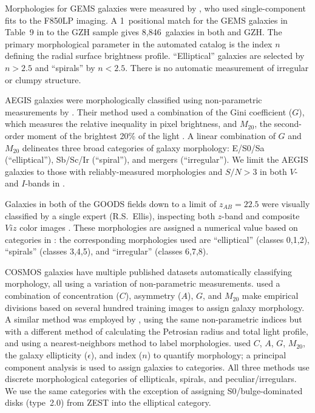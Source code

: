 \documentclass[twocolumn]{aastex6}
\begin{document}
Morphologies for GEMS galaxies were measured by \citet{hau07}, who used
single-component \sersic{} fits to the F850LP imaging. A 1\arcsec~positional
match for the GEMS galaxies in Table~9 in \citet{hau07} to the GZH sample gives
8,846~galaxies in both \citet{hau07} and GZH. The primary morphological
parameter in the automated catalog is the \sersic{} index $n$ defining the
radial surface brightness profile.  ``Elliptical'' galaxies are selected by
$n>2.5$ and ``spirals''  by $n<2.5$.  There is no automatic measurement of
irregular or clumpy structure. 

AEGIS galaxies were morphologically classified using non-parametric
measurements by \citet{lot08}. Their method used a combination of the Gini
coefficient ($G$), which measures the relative inequality in pixel brightness,
and $M_{20}$, the second-order moment of the brightest 20\% of the light
\citep{lot04}. A linear combination of $G$ and $M_{20}$ delineates three broad
categories of galaxy morphology: E/S0/Sa (``elliptical''), Sb/Sc/Ir
(``spiral''), and mergers (``irregular''). We limit the AEGIS galaxies to those
with reliably-measured morphologies and $S/N>3$ in both $V$- and $I$-bands in
\citet{lot08}. 

Galaxies in both of the GOODS fields down to a limit of $z_{AB}=22.5$ were
visually classified by a single expert (R.S.~Ellis), inspecting both $z$-band
and composite $Viz$ color images \citep{bun05}. These morphologies are assigned
a numerical value based on categories in \citet{bri98a}: the corresponding
morphologies used are ``elliptical'' (classes 0,1,2), ``spirals'' (classes
3,4,5), and ``irregular'' (classes 6,7,8).

COSMOS galaxies have multiple published datasets automatically classifying
morphology, all using a variation of non-parametric measurements. \citet{cas07}
used a combination of concentration ($C$), asymmetry ($A$), $G$, and $M_{20}$
\citep{cas05} make empirical divisions based on several hundred training images
to assign galaxy morphology. A similar method was employed by \citet{tas11},
using the same non-parametric indices but with a different method of
calculating the Petrosian radius and total light profile, and using a
nearest-neighbors method to label morphologies. \citet[][ZEST]{sca07} used $C$,
$A$, $G$, $M_{20}$, the galaxy ellipticity ($\epsilon$), and \sersic{} index
($n$) to quantify morphology; a principal component analysis is used to assign
galaxies to categories. All three methods use discrete morphological categories
of ellipticals, spirals, and peculiar/irregulars. We use the same categories
with the exception of assigning S0/bulge-dominated disks (type~2.0) from ZEST
into the elliptical category.
\end{document}
